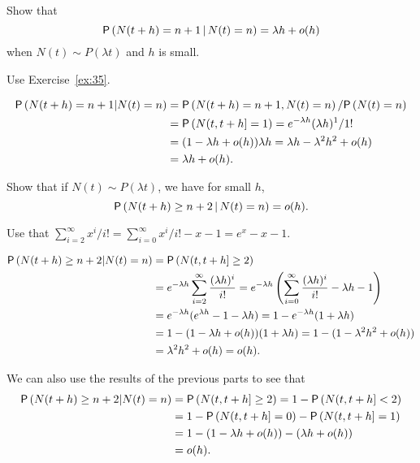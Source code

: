 \begin{extra}
  Show that
  \begin{equation*}
\P{N(t+h) = n+1 \given N(t) = n} = \lambda h + o(h)
  \end{equation*}
when $N(t) \sim P(\lambda t)$ and $h$ is small. 
  \begin{hint} Use  Exercise~\ref{ex:35}.
    \end{hint}
\begin{solution}
  \begin{align*}
  \P{N(t+h) = n +1 | N(t) = n} 
&=  \P{N(t+h) = n +1 , N(t) =n}/\P{N(t) = n}\\
&= \P{N(t, t+h] = 1} = e^{-\lambda h} (\lambda h)^1/1! \\
&= (1-\lambda h + o(h))\lambda h  = \lambda h - \lambda^2 h^2 + o(h) \\
&= \lambda h + o(h). 
  \end{align*}
\end{solution}
\end{extra}

\begin{extra}
  Show that if $N(t) \sim P(\lambda t)$, we have for small $h$,
  \begin{equation*}
 \P{N(t+h) \geq n+2 \given N(t) = n} = o(h).
  \end{equation*}
    \begin{hint}
 Use that  $\sum_{i=2}^\infty x^i/i! = \sum_{i=0}^\infty x^i/i! - x -1 = e^x -x - 1$.
    \end{hint}
\begin{solution}
  \begin{align*}
  \P{N(t+h) \geq n+2 | N(t) = n} 
&= \P{N(t, t+h] \geq 2} \\
&= e^{-\lambda h} \sum_{i=2}^\infty \frac{(\lambda h)^i}{i!} 
= e^{-\lambda h} \left(\sum_{i=0}^\infty \frac{(\lambda h)^i}{i!} - \lambda h - 1\right)\\
&= e^{-\lambda h}(e^{\lambda h} - 1 - \lambda h) 
= 1 - e^{-\lambda h}(1 + \lambda h) \\
&= 1 - (1-\lambda h + o(h))(1+\lambda h) 
= 1 - (1-\lambda^2 h^2 + o(h)) \\
&= \lambda^2 h^2 + o(h) = o(h).
  \end{align*}

We can also use the results of the previous parts to see that
\begin{align*}
  \P{N(t+h) \geq n+2 | N(t) = n} 
&= \P{N(t, t+h] \geq 2} = 1- \P{N(t, t+h]<2} \\
&= 1 - \P{N(t, t+h]= 0} - \P{N(t, t+h]=1} \\
&= 1 - (1-\lambda h + o(h) ) - (\lambda h + o(h)) \\
&= o(h).
\end{align*}
\end{solution}
\end{extra}



